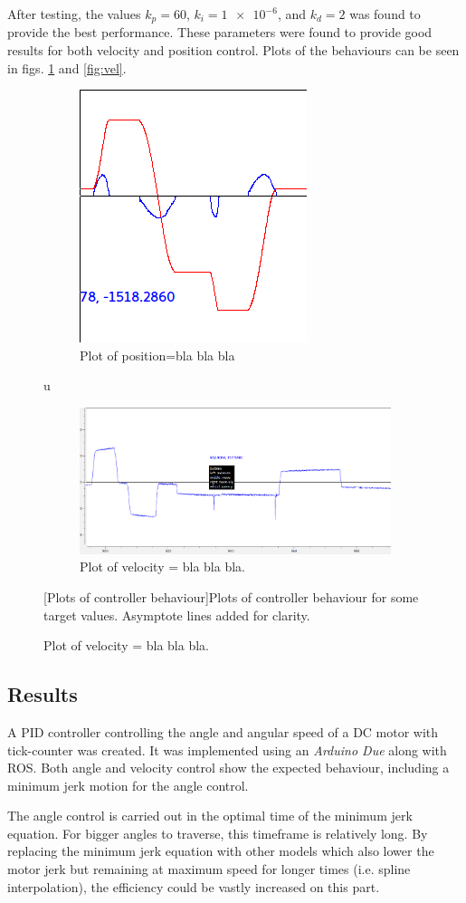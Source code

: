 \documentclass[11pt]{article}
\begin{document}
After testing, the values $k_p = 60$, $k_i = \num{1e-6}$, and $k_d = 2$ was found to provide the best performance. These parameters were found to provide good results for both velocity and position control. Plots of the behaviours can be seen in figs. \ref{fig:pos} and \vref{fig:vel}. \par

\begin{figure}[h]
  \begin{subfigure}[b]{.45\textwidth}
    \includegraphics[width=.5\textwidth]{figures/posplot.png}
    \caption{Plot of position=bla bla bla}\label{fig:pos}
  \end{subfigure} 
u  \begin{subfigure}[b]{.45\textwidth}
    \includegraphics[width=.5\textwidth]{figures/velplot.png}
    \caption{Plot of velocity = bla bla bla.}    \label{fig:ve}
  \end{subfigure}
  [Plots of controller behaviour]{Plots of controller behaviour for some target values. Asymptote lines added for clarity.}
\end{figure}
\subsection{Results}
A PID controller controlling the angle and angular speed of a DC motor with tick-counter was created. It was implemented using an \emph{Arduino Due} along with ROS. Both angle and velocity control show the expected behaviour, including a minimum jerk motion for the angle control.\par
The angle control is carried out in the optimal time of the minimum jerk equation. For bigger angles to traverse, this timeframe is relatively long. By replacing the minimum jerk equation with other models which also lower the motor jerk but remaining at maximum speed for longer times (i.e. spline interpolation), the efficiency could be vastly increased on this part.
\end{document}
